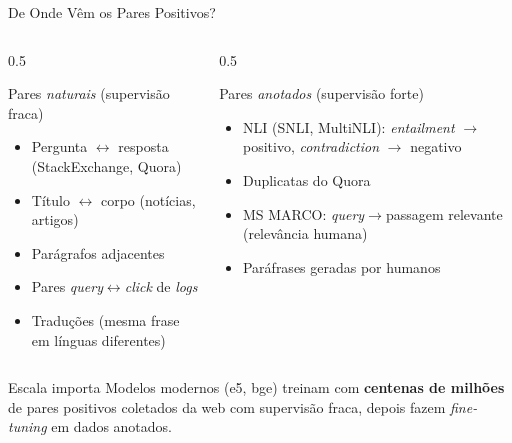 \documentclass[aspectratio=169, xcolor=dvipsnames]{beamer}
\begin{document}
  \begin{frame}{De Onde Vêm os Pares Positivos?}
    \begin{columns}[T]
      \begin{column}{0.5\textwidth}
        \begin{block}{Pares \textit{naturais} (supervisão fraca)}
          \begin{itemize}
            \item Pergunta $\leftrightarrow$ resposta (StackExchange, Quora)
            \item Título $\leftrightarrow$ corpo (notícias, artigos)
            \item Parágrafos adjacentes
            \item Pares \textit{query}$\leftrightarrow$\textit{click} de \textit{logs}
            \item Traduções (mesma frase em línguas diferentes)
          \end{itemize}
        \end{block}
      \end{column}
      \begin{column}{0.5\textwidth}
        \begin{block}{Pares \textit{anotados} (supervisão forte)}
          \begin{itemize}
            \item NLI (SNLI, MultiNLI): \textit{entailment} $\to$ positivo, \textit{contradiction} $\to$ negativo
            \item Duplicatas do Quora
            \item MS MARCO: \textit{query}$\to$passagem relevante (relevância humana)
            \item Paráfrases geradas por humanos
          \end{itemize}
        \end{block}
      \end{column}
    \end{columns}
    \vspace{0.4em}
    \begin{alertblock}{Escala importa}
      Modelos modernos (e5, bge) treinam com \textbf{centenas de milhões} de pares positivos coletados da web com supervisão fraca, depois fazem \textit{fine-tuning} em dados anotados.
    \end{alertblock}
  \end{frame}
\end{document}
